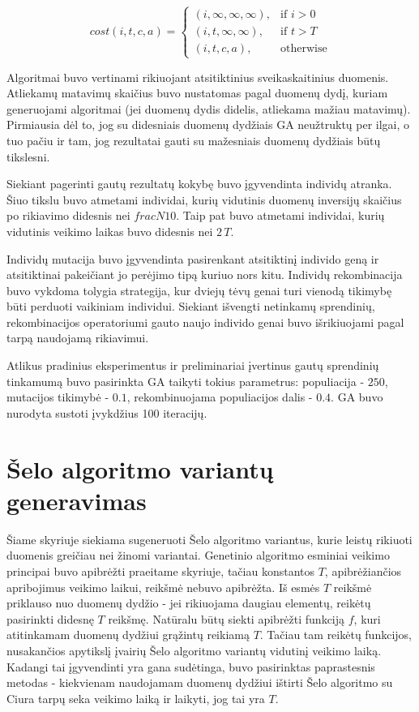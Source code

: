 \documentclass{VUMIFInfBakalaurinis}
\begin{document}
\[
  cost(i, t, c, a)=
  \begin{cases}
    (i, \infty, \infty, \infty),& \text{if } i > 0\\
    (i, t, \infty, \infty),& \text{if } t > T\\
    (i, t, c, a), & \text{otherwise}
  \end{cases}
\]

Algoritmai buvo vertinami rikiuojant atsitiktinius sveikaskaitinius duomenis.
Atliekamų matavimų skaičius buvo nustatomas pagal duomenų dydį, kuriam generuojami algoritmai (jei duomenų dydis didelis, atliekama mažiau matavimų).
Pirmiausia dėl to, jog su didesniais duomenų dydžiais GA neužtruktų per ilgai, o tuo pačiu ir tam,
jog rezultatai gauti su mažesniais duomenų dydžiais būtų tikslesni.

Siekiant pagerinti gautų rezultatų kokybę buvo įgyvendinta individų atranka.
Šiuo tikslu buvo atmetami individai, kurių vidutinis duomenų inversijų skaičius po rikiavimo didesnis nei $frac{N}{10}$.
Taip pat buvo atmetami individai, kurių vidutinis veikimo laikas buvo didesnis nei $2\,T$.

Individų mutacija buvo įgyvendinta pasirenkant atsitiktinį individo geną ir atsitiktinai pakeičiant jo perėjimo tipą kuriuo nors kitu.
Individų rekombinacija buvo vykdoma tolygia strategija, kur dviejų tėvų genai turi vienodą tikimybę
būti perduoti vaikiniam individui.
Siekiant išvengti netinkamų sprendinių, rekombinacijos operatoriumi gauto naujo individo genai buvo išrikiuojami pagal tarpą naudojamą rikiavimui.

Atlikus pradinius eksperimentus ir preliminariai įvertinus gautų sprendinių tinkamumą buvo pasirinkta GA taikyti tokius parametrus:
populiacija - $250$, mutacijos tikimybė - $0.1$, rekombinuojama populiacijos dalis - $0.4$.
GA buvo nurodyta sustoti įvykdžius 100 iteracijų.

\section{Šelo algoritmo variantų generavimas}

Šiame skyriuje siekiama sugeneruoti Šelo algoritmo variantus,
kurie leistų rikiuoti duomenis greičiau nei žinomi variantai.
Genetinio algoritmo esminiai veikimo principai buvo apibrėžti praeitame skyriuje, tačiau
konstantos $T$, apibrėžiančios apribojimus veikimo laikui, reikšmė nebuvo apibrėžta.
Iš esmės $T$ reikšmė priklauso nuo duomenų dydžio - jei rikiuojama daugiau elementų, reikėtų pasirinkti didesnę $T$ reikšmę.
Natūralu būtų siekti apibrėžti funkciją $f$, kuri atitinkamam duomenų dydžiui grąžintų reikiamą $T$.
Tačiau tam reikėtų funkcijos, nusakančios apytikslį įvairių Šelo algoritmo variantų vidutinį veikimo laiką.
Kadangi tai įgyvendinti yra gana sudėtinga, buvo pasirinktas paprastesnis metodas - kiekvienam naudojamam duomenų dydžiui ištirti
Šelo algoritmo su Ciura tarpų seka veikimo laiką ir laikyti, jog tai yra $T$.
\end{document}
